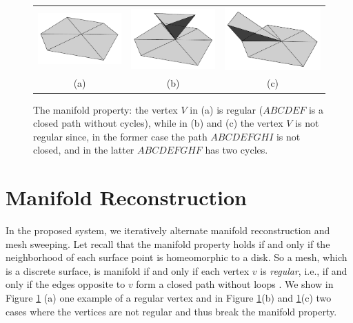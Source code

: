\begin{figure}[t]
\centering
\begin{tabular}{ccc}
\includegraphics[width=0.28\columnwidth]{./img/manifold}&
\includegraphics[width=0.28\columnwidth]{./img/notmanifold1}&
\includegraphics[width=0.28\columnwidth]{./img/notmanifold2}\\
(a)&(b)&(c)
\end{tabular}
\caption{The manifold property: the vertex $V$ in (a) is regular ($ABCDEF$ is a closed path without cycles), while in (b) and (c) the vertex $V$ is not regular since, in the former case the path $ABCDEFGHI$ is not closed, and in the latter $ABCDEFGHF$ has two cycles.}
\label{fig:vertexManifold}
\end{figure}


\section{Manifold Reconstruction}
\label{sec:manifold_ch6}
In the proposed system, we iteratively alternate manifold reconstruction and mesh sweeping.
Let recall that the manifold property holds if and only if the neighborhood of each surface point is homeomorphic to a disk. 
So a mesh, which is a discrete surface, is manifold if and only if each vertex $v$ is \emph{regular}, i.e., if and only if the edges opposite to $v$ form a closed path without loops  \cite{litvinov_lhuillier_13}. 
We show in Figure \ref{fig:vertexManifold} (a) one example of a regular vertex and in Figure \ref{fig:vertexManifold}(b) and \ref{fig:vertexManifold}(c) two cases where the vertices are not regular and thus break the manifold property.

